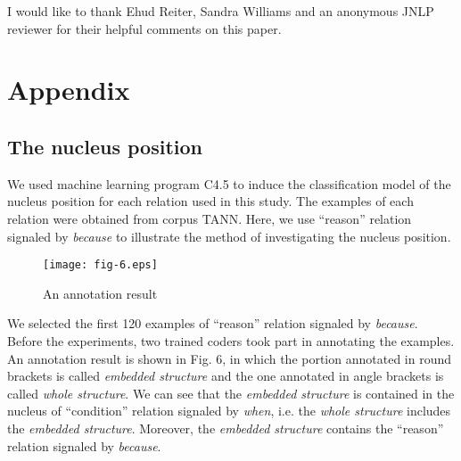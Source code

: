 \documentclass[english]{jnlp_1.2.0}
\begin{document}
\acknowledgment

I would like to thank Ehud Reiter, Sandra Williams and an anonymous
JNLP reviewer for their helpful comments on this paper.

\appendix

    \section*{Appendix}
    \subsection*{The nucleus position}

We used machine learning program C4.5 \cite{Eugenio97}
to induce the classification model of the nucleus position for each relation 
used in this study. The examples of each relation were obtained from corpus 
TANN. Here, we use ``reason'' relation signaled by \textit{because} to 
illustrate the method of investigating the nucleus position.

\begin{figure}[b]
\begin{center}
    \texttt{[image: fig-6.eps]}
\end{center}
\caption{An annotation result}
\end{figure}

We selected the first 120 examples of ``reason'' relation signaled by
\textit{because}. Before the experiments, two trained coders took
part in annotating the examples. An annotation result is shown in 
Fig. 6, in which the portion annotated in round brackets is 
called \textit{embedded structure} and the one annotated in angle 
brackets is called \textit{whole structure}. We can see that the 
\textit{embedded structure} is contained in the nucleus of ``condition'' 
relation signaled by \textit{when}, i.e. the \textit{whole structure} 
includes the \textit{embedded structure}. Moreover, the 
\textit{embedded structure} contains the ``reason'' relation
signaled by \textit{because}.
\end{document}
